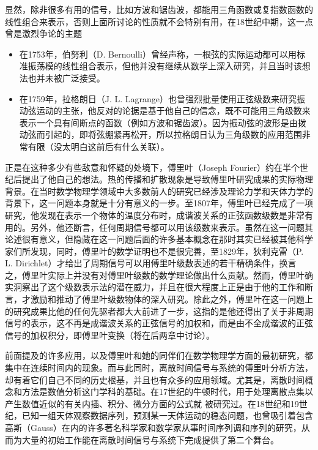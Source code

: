显然，除非很多有用的信号，比如方波和锯齿波，都能用三角函数或复指数函数的线性组合来表示，否则上面所讨论的性质就不会特别有用，在18世纪中期，这一点曾是激烈争论的主题
\begin{itemize}
    \item 在1753年，伯努利（D. Bernoulli）曾经声称，一根弦的实际运动都可以用标准振荡模的线性组合表示，但他并没有继续从数学上深入研究，并且当时该想法也并未被广泛接受。
    \item 在1759年，拉格朗日（J. L. Lagrange）也曾强烈批量使用正弦级数来研究振动弦运动的主张，他反对的论据是基于他自己的信念，既不可能用三角级数来表示一个具有间断点的函数（例如方波和锯齿波）。因为振动弦的波形是由拨动弦而引起的，即将弦绷紧再松开，所以拉格朗日认为三角级数的应用范围非常有限（没太明白这前后有什么关联）。
\end{itemize}
正是在这种多少有些敌意和怀疑的处境下，傅里叶（Joseph Fourier）约在半个世纪后提出了他自己的想法。热的传播和扩散现象是导致傅里叶研究成果的实际物理背景。在当时数学物理学领域中大多数前人的研究已经涉及理论力学和天体力学的背景下，这一问题本身就是十分有意义的一步。至1807年，傅里叶已经完成了一项研究，他发现在表示一个物体的温度分布时，成谐波关系的正弦函数级数是非常有用的。另外，他还断言，任何周期信号都可以用该级数来表示。虽然在这一问题其论述很有意义，但隐藏在这一问题后面的许多基本概念在那时其实已经被其他科学家们所发现，同时，傅里叶的数学证明也不是很完善，至1829年，狄利克雷（P. L. Dirichlet）才给出了周期信号可以用傅里叶级数表述的若干精确条件，换言之，傅里叶实际上并没有对傅里叶级数的数学理论做出什么贡献。然而，傅里叶确实洞察出了这个级数表示法的潜在威力，并且在很大程度上正是由于他的工作和断言，才激励和推动了傅里叶级数物体的深入研究。除此之外，傅里叶在这一问题上的研究成果比他的任何先驱者都大大前进了一步，这指的是他还得出了关于非周期信号的表示，这不再是成谐波关系的正弦信号的加权和，而是由不全成谐波的正弦信号的加权积分，即傅里叶变换（将在后两章中讨论）。

前面提及的许多应用，以及傅里叶和她的同伴们在数学物理学方面的最初研究，都集中在连续时间内的现象。而与此同时，离散时间信号与系统的傅里叶分析方法，却有着它们自己不同的历史根基，并且也有众多的应用领域。尤其是，离散时间概念和方法是数值分析这门学科的基础。在17世纪的牛顿时代，用于处理离散点集以产生数值近似的有关内插、积分、微分方面的公式就  被研究过。在18世纪和19世纪，已知一组天体观察数据序列，预测某一天体运动的稳态问题，也曾吸引着包含高斯（Gauss）在内的许多著名科学家和数学家从事时间序列调和序列的研究，从而为大量的初始工作能在离散时间信号与系统下完成提供了第二个舞台。